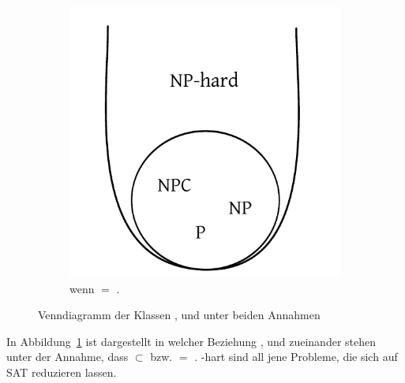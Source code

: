 \begin{figure}
\begin{center}
\begin{subfigure}[b]{0.4\textwidth}
      \includegraphics[width=\textwidth]{img/np_eq_p.pdf}
      \caption{wenn \cP{} $=$ \cNP{}.}
    \end{subfigure}
  \end{center}
  \caption{Venndiagramm der Klassen \cNP{}, \cP{} und \cNPC{} unter beiden Annahmen}
  \label{fig:p_np_npc}
\end{figure}

In Abbildung~\ref{fig:p_np_npc} ist dargestellt in welcher Beziehung \cP{}, \cNP{} und \cNPC{} zueinander stehen unter der Annahme, dass \cP{} $\subset$ \cNP{} bzw. \cP{} $=$ \cNP{}. \cNP{}-hart sind all jene Probleme, die sich auf SAT reduzieren lassen.

